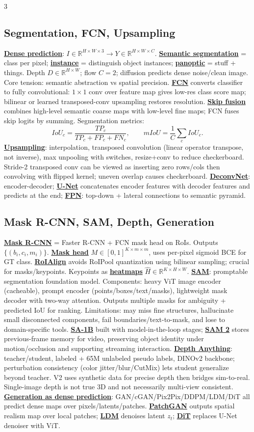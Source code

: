 \documentclass{article}
\numberwithin{equation}{subsection}
\newcommand{\lowterm}[1]{\textbf{\underline{#1}}}
\newcommand{\R}{\mathbb{R}}
\begin{document}
\begin{multicols*}{3}
\subsection{Segmentation, FCN, Upsampling}
\lowterm{Dense prediction}: $I\in\R^{H\times W\times3}\to Y\in\R^{H\times W\times C}$. \lowterm{Semantic segmentation} = class per pixel; \lowterm{instance} = distinguish object instances; \lowterm{panoptic} = stuff + things. Depth $D\in\R^{H\times W}$; flow $C=2$; diffusion predicts dense noise/clean image. Core tension: semantic abstraction vs spatial precision.
\lowterm{FCN} converts classifier to fully convolutional: $1\times1$ conv over feature map gives low-res class score map; bilinear or learned transposed-conv upsampling restores resolution. \lowterm{Skip fusion} combines high-level semantic coarse maps with low-level fine maps; FCN fuses skip logits by summing. Segmentation metrics:
\[
IoU_c=\frac{TP_c}{TP_c+FP_c+FN_c},\qquad mIoU=\frac1C\sum_cIoU_c.
\]
\lowterm{Upsampling}: interpolation, transposed convolution (linear operator transpose, not inverse), max unpooling with switches, resize+conv to reduce checkerboard. Stride-2 transposed conv can be viewed as inserting zero rows/cols then convolving with flipped kernel; uneven overlap causes checkerboard. \lowterm{DeconvNet}: encoder-decoder; \lowterm{U-Net} concatenates encoder features with decoder features and predicts at the end; \lowterm{FPN}: top-down + lateral connections to semantic pyramid.

\subsection{Mask R-CNN, SAM, Depth, Generation}
\lowterm{Mask R-CNN} = Faster R-CNN + FCN mask head on RoIs. Outputs $\{(b_i,c_i,m_i)\}$. \lowterm{Mask head} $M\in[0,1]^{K\times m\times m}$, uses per-pixel sigmoid BCE for GT class. \lowterm{RoIAlign} avoids RoIPool quantization using bilinear sampling; crucial for masks/keypoints. Keypoints as \lowterm{heatmaps} $\hat H\in\R^{K\times H\times W}$.
\lowterm{SAM}: promptable segmentation foundation model. Components: heavy ViT image encoder (cacheable), prompt encoder (points/boxes/text/masks), lightweight mask decoder with two-way attention. Outputs multiple masks for ambiguity + predicted IoU for ranking. Limitations: may miss fine structures, hallucinate small disconnected components, fail boundaries/text-to-mask, and lose to domain-specific tools. \lowterm{SA-1B} built with model-in-the-loop stages; \lowterm{SAM 2} stores previous-frame memory for video, preserving object identity under motion/occlusion and supporting streaming interaction.
\lowterm{Depth Anything}: teacher/student, labeled + 65M unlabeled pseudo labels, DINOv2 backbone; perturbation consistency (color jitter/blur/CutMix) lets student generalize beyond teacher. V2 uses synthetic data for precise depth then bridges sim-to-real. Single-image depth is not true 3D and not necessarily multi-view consistent.
\lowterm{Generation as dense prediction}: GAN/cGAN/Pix2Pix/DDPM/LDM/DiT all predict dense maps over pixels/latents/patches. \lowterm{PatchGAN} outputs spatial realism map over local patches; \lowterm{LDM} denoises latent $z_t$; \lowterm{DiT} replaces U-Net denoiser with ViT.


\end{multicols*}
\end{document}
